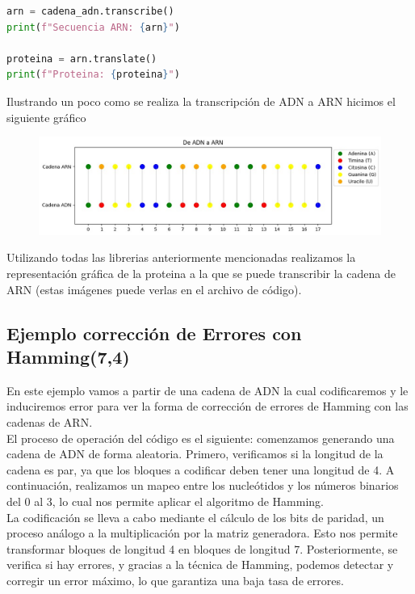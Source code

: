\begin{lstlisting}[language=Python]
arn = cadena_adn.transcribe()
print(f"Secuencia ARN: {arn}")

proteina = arn.translate()
print(f"Proteina: {proteina}")
\end{lstlisting}
Ilustrando un poco como se realiza la transcripción de ADN a ARN hicimos el siguiente gráfico
\begin{figure}[h]
\centering
        \includegraphics[scale=0.25]{arn.png} 
    \end{figure}
Utilizando todas las librerias anteriormente mencionadas realizamos la representación gráfica de la proteina a la que se puede transcribir la cadena de ARN (estas imágenes puede verlas en el archivo de código).\\

\subsection{Ejemplo corrección de Errores con Hamming(7,4)}

En este ejemplo vamos a partir de una cadena de ADN la cual codificaremos y le induciremos error para ver la forma de  corrección de errores de Hamming con las cadenas de ARN.\\

El proceso de operación del código es el siguiente: comenzamos generando una cadena de ADN de forma aleatoria. Primero, verificamos si la longitud de la cadena es par, ya que los bloques a codificar deben tener una longitud de 4. A continuación, realizamos un mapeo entre los nucleótidos y los números binarios del 0 al 3, lo cual nos permite aplicar el algoritmo de Hamming.\\

La codificación se lleva a cabo mediante el cálculo de los bits de paridad, un proceso análogo a la multiplicación por la matriz generadora. Esto nos permite transformar bloques de longitud 4 en bloques de longitud 7. Posteriormente, se verifica si hay errores, y gracias a la técnica de Hamming, podemos detectar y corregir un error máximo, lo que garantiza una baja tasa de errores.\\

